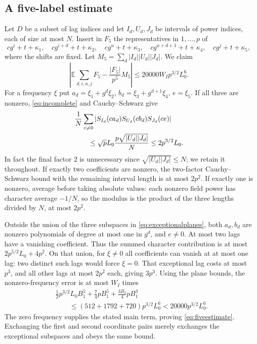 \documentclass[10pt]{amsart}
\theoremstyle{remark}
\newcommand{\E}{\mathbb E}
\begin{document}
\subsection{A five-label estimate}
Let $D$ be a subset of lag indices and let $I_d,U_d,J_d$ be intervals
of power indices, each of size at most $N$. Insert in $F_5$ the
representatives in $1,\ldots,p$ of
\[
 cg^i+t+\kappa_1,\quad cg^{i+d}+t+\kappa_2,\quad
 cg^u+t+\kappa_3,\quad cg^{u+d+1}+t+\kappa_4,\quad
 cg^j+t+\kappa_5,
\]
where the shifts are fixed. Let $M_5=\sum_d|I_d||U_d||J_d|$.
We claim
\begin{equation}\label{eq:fiveestimate}
 \left|\E\sum_{d,i,u,j}F_5-\frac{|F_5|}{p^5}M_5\right|
 \le20000W_Ip^{3/2}L_0^6.
\end{equation}
For a frequency $\xi$ put $a_d=\xi_1+g^d\xi_2$,
$b_d=\xi_3+g^{d+1}\xi_4$, $e=\xi_5$.
If all three are nonzero, \eqref{eq:incomplete} and Cauchy--Schwarz give
\begin{align}\label{eq:threeintervals}
 &\frac1N\sum_{c\ne0}
 |S_{I_d}(ca_d)S_{U_d}(cb_d)S_{J_d}(ce)|\notag\\
 &\qquad\le\sqrt pL_0\frac{p\sqrt{|U_d||J_d|}}N
 \le2p^{3/2}L_0.
\end{align}
In fact the final factor $2$ is unnecessary since
$\sqrt{|U_d||J_d|}\le N$; we retain it throughout.
If exactly two coefficients are nonzero, the two-factor
Cauchy--Schwarz bound with the remaining interval length is at most
$2p^2$. If exactly one is nonzero, average before taking absolute
values: each nonzero field power has character average $-1/N$, so
the modulus is the product of the three lengths divided by $N$,
at most $2p^2$.

Outside the union of the three subspaces in
\eqref{eq:exceptionalplanes}, both $a_d,b_d$ are nonzero polynomials
of degree at most one in $g^d$, and $e\ne0$. At most two lags have
a vanishing coefficient. Thus the summed character contribution is
at most $2p^{5/2}L_0+4p^2$. On that union, for $\xi\ne0$ all
coefficients can vanish at at most one lag: two distinct such lags
would force $\xi=0$. That exceptional lag costs at most $p^3$, and
all other lags at most $2p^2$ each, giving $3p^3$.
Using the plane bounds, the nonzero-frequency error is at most
$W_I$ times
\begin{align*}
 &\tfrac12p^{3/2}L_0B_1^5+\tfrac74pB_1^5
       +\tfrac{3B_2}{4}pB_1^3\\
 &\qquad\le(512+1792+720)p^{3/2}L_0^6
 <20000p^{3/2}L_0^6.
\end{align*}
The zero frequency supplies the stated main term, proving
\eqref{eq:fiveestimate}. Exchanging the first and second coordinate
pairs merely exchanges the exceptional subspaces and obeys the same
bound.
\end{document}
